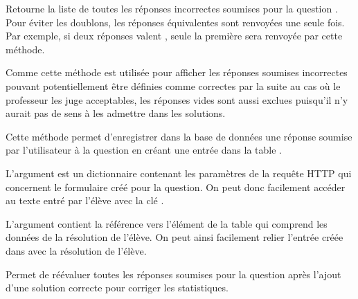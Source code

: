 \documentclass[a4paper,11pt,openany,oneside]{sphinxmanual}
\begin{document}
\begin{fulllineitems}
\begin{fulllineitems}
\end{fulllineitems}


\begin{fulllineitems}
\label{database:quiz.models.SimpleQuestion.get_wrong_answers}
Retourne la liste de toutes les réponses incorrectes soumises pour la question .
Pour éviter les doublons, les réponses équivalentes sont renvoyées une seule fois.
Par exemple, si deux réponses valent , seule la première sera renvoyée par
cette méthode.

Comme cette méthode est utilisée pour afficher les réponses soumises incorrectes pouvant
potentiellement être définies comme correctes par la suite au cas où le 
professeur les juge acceptables, les réponses vides sont aussi exclues 
puisqu'il n'y aurait pas de sens à les admettre dans les solutions.

\end{fulllineitems}


\begin{fulllineitems}
\label{database:quiz.models.SimpleQuestion.save_submit}
Cette méthode permet d'enregistrer dans la base de données une réponse soumise
par l'utilisateur à la question  en créant une entrée dans la table
.

L'argument  est un dictionnaire contenant les paramètres de la 
requête HTTP qui concernent le formulaire créé pour la question. On peut donc
facilement accéder au texte entré par l'élève avec la clé .

L'argument  contient la référence vers l'élément de la table
 qui comprend les données de la résolution de l'élève. On
peut ainsi facilement relier l'entrée créée dans  avec la résolution
de l'élève.

\end{fulllineitems}


\begin{fulllineitems}
\label{database:quiz.models.SimpleQuestion.update_question_results}
Permet de réévaluer toutes les réponses soumises pour la question après
l'ajout d'une solution correcte pour corriger les statistiques.


\end{fulllineitems}
\end{fulllineitems}
\end{document}

